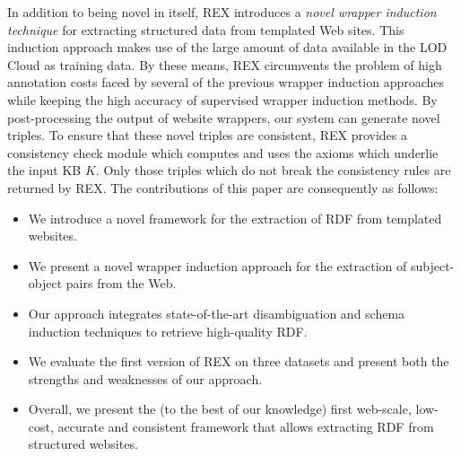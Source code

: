 In addition to being novel in itself, REX introduces a \emph{novel wrapper induction technique} for extracting structured data from templated Web sites. 
This induction approach makes use of the large amount of data available in the \ac{LOD} Cloud as training data. 
By these means, REX circumvents the problem of high annotation costs faced by several of the previous wrapper induction approaches~\cite{flesca2004web,Hogue:2005:TAU:1060745.1060762} while keeping the high accuracy of supervised wrapper induction methods. 
By post-processing the output of website wrappers, our system can generate novel triples. 
To ensure that these novel triples are consistent, REX provides a consistency check module which computes and uses the axioms which underlie the input  \ac{KB} $K$. 
Only those triples which do not break the consistency rules are returned by REX. 
The contributions of this paper are consequently as follows:
\begin{itemize}
\item We introduce a novel framework for the extraction of \ac{RDF} from templated websites.
\item We present a novel wrapper induction approach for the extraction of subject-object pairs from the Web.
\item Our approach integrates state-of-the-art disambiguation and schema induction techniques to retrieve high-quality \ac{RDF}. 
\item We evaluate the first version of REX on three datasets and present both the strengths and weaknesses of our approach.
\item Overall, we present the (to the best of our knowledge) first web-scale, low-cost, accurate and consistent framework that allows extracting \ac{RDF} from structured websites.
\end{itemize}


